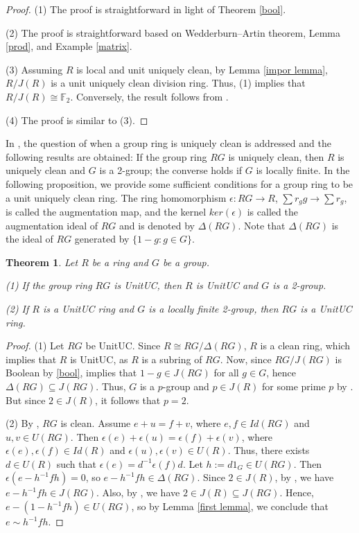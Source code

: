 \documentclass[12pt]{amsart}
\newtheorem{theorem}{Theorem}[section]
\theoremstyle{definition}
\begin{document}
\begin{proof}
(1) The proof is straightforward in light of Theorem \ref{bool}.
    
(2) The proof is straightforward based on Wedderburn–Artin theorem, Lemma \ref{prod}, and Example \ref{matrix}.

(3) Assuming $R$ is local and unit uniquely clean, by Lemma \ref{impor lemma}, $R/J(R)$ is a unit uniquely clean division ring. Thus, (1) implies that $R/J(R) \cong \mathbb{F}_2$. Conversely, the result follows from \cite[Theorem 15]{NZ}.

(4) The proof is similar to (3).
\end{proof}
In \cite{cnz}, the question of when a group ring is uniquely clean is addressed and the following results are obtained: If the group ring $RG$ is uniquely clean, then $R$ is uniquely clean and $G$ is a 2-group; the converse holds if $G$ is locally finite. In the following proposition, we provide some sufficient conditions for a group ring to be a unit uniquely clean ring. The ring homomorphism $\epsilon: RG \to R$, $\sum r_gg \to \sum r_g$, is called the augmentation map, and the kernel $ker(\epsilon)$ is called the augmentation ideal of $RG$ and is denoted by $\Delta(RG)$. Note that $\Delta(RG)$ is the ideal of $RG$ generated by $\{1 - g : g \in G \}$.

\begin{theorem}\label{19} Let $R$ be a ring and $G$ be a group.\par
     (1) If the group ring $RG$ is   UnitUC, then $R$ is   UnitUC and $G$ is a 2-group.\par (2) If $R$ is a   UnitUC ring and $G$ is a locally finite 2-group, then $RG$ is a   UnitUC ring.
\end{theorem}
\begin{proof}
 (1)   Let $RG$ be   UnitUC. Since $R \cong RG/\Delta(RG)$, $R$ is a clean ring, which implies that $R$ is   UnitUC, as $R$ is a subring of $RG$. Now, since $RG/J(RG)$ is Boolean by \ref{bool}, implies that $1 - g \in J(RG)$ for all $g \in G$, hence $\Delta(RG) \subseteq J(RG)$. Thus, $G$ is a $p$-group and $p \in J(R)$ for some prime $p$ by \cite[Proposition 15(i)]{con}. But since $2 \in J(R)$, it follows that $p=2$.\par
 (2) By \cite[Theorem 4]{zhou2}, $RG$ is clean. Assume $e+u=f+v$, where $e,f \in Id(RG)$ and $u,v \in U(RG)$. Then $\epsilon(e)+\epsilon(u) = \epsilon(f)+\epsilon(v)$, where $\epsilon(e),\epsilon(f) \in Id(R)$ and $\epsilon(u),\epsilon(v) \in U(R)$. Thus, there exists $d \in U(R)$ such that $\epsilon(e)=d^{-1}\epsilon(f)d$. Let $h:=d1_G\in U(RG)$. Then $\epsilon(e-h^{-1}fh)=0$, so $e-h^{-1}fh \in \Delta(RG)$. Since $2 \in J(R)$, by \cite[Lemma 2]{zhou2}, we have $e-h^{-1}fh \in J(RG)$. Also, by \cite[Proposition 9]{con}, we have $2 \in J(R) \subseteq J(RG)$. Hence, $e-(1-h^{-1}fh) \in U(RG)$, so by Lemma \ref{first lemma}, we conclude that $e \sim h^{-1}fh$.
\end{proof}
\end{document}
